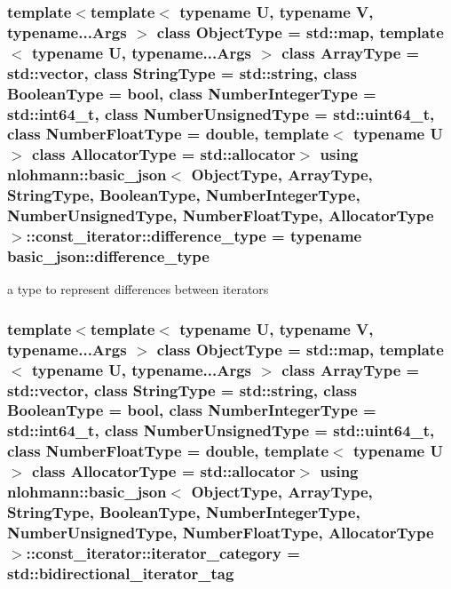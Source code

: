 \hypertarget{classnlohmann_1_1basic__json_1_1const__iterator_a49d7c3e9ef3280df03052cce988b792f}{
\subsubsection[{difference\-\_\-type}]{\setlength{\rightskip}{0pt plus 5cm}template$<$template$<$ typename U, typename V, typename...\-Args $>$ class Object\-Type = std\-::map, template$<$ typename U, typename...\-Args $>$ class Array\-Type = std\-::vector, class String\-Type  = std\-::string, class Boolean\-Type  = bool, class Number\-Integer\-Type  = std\-::int64\-\_\-t, class Number\-Unsigned\-Type  = std\-::uint64\-\_\-t, class Number\-Float\-Type  = double, template$<$ typename U $>$ class Allocator\-Type = std\-::allocator$>$ using {\bf nlohmann\-::basic\-\_\-json}$<$ Object\-Type, Array\-Type, String\-Type, Boolean\-Type, Number\-Integer\-Type, Number\-Unsigned\-Type, Number\-Float\-Type, Allocator\-Type $>$\-::{\bf const\-\_\-iterator\-::difference\-\_\-type} =  typename {\bf basic\-\_\-json\-::difference\-\_\-type}}}\label{classnlohmann_1_1basic__json_1_1const__iterator_a49d7c3e9ef3280df03052cce988b792f}


a type to represent differences between iterators 

\hypertarget{classnlohmann_1_1basic__json_1_1const__iterator_a821560d64f50525162097f19b1392e7f}{
\subsubsection[{iterator\-\_\-category}]{\setlength{\rightskip}{0pt plus 5cm}template$<$template$<$ typename U, typename V, typename...\-Args $>$ class Object\-Type = std\-::map, template$<$ typename U, typename...\-Args $>$ class Array\-Type = std\-::vector, class String\-Type  = std\-::string, class Boolean\-Type  = bool, class Number\-Integer\-Type  = std\-::int64\-\_\-t, class Number\-Unsigned\-Type  = std\-::uint64\-\_\-t, class Number\-Float\-Type  = double, template$<$ typename U $>$ class Allocator\-Type = std\-::allocator$>$ using {\bf nlohmann\-::basic\-\_\-json}$<$ Object\-Type, Array\-Type, String\-Type, Boolean\-Type, Number\-Integer\-Type, Number\-Unsigned\-Type, Number\-Float\-Type, Allocator\-Type $>$\-::{\bf const\-\_\-iterator\-::iterator\-\_\-category} =  std\-::bidirectional\-\_\-iterator\-\_\-tag}}\label{classnlohmann_1_1basic__json_1_1const__iterator_a821560d64f50525162097f19b1392e7f}


